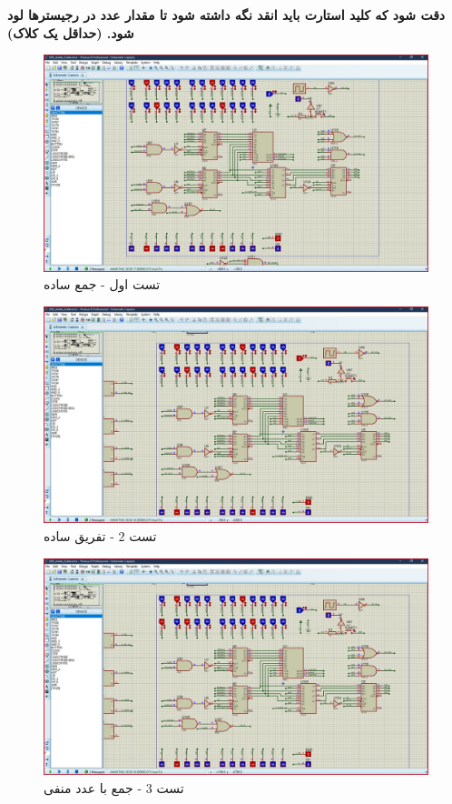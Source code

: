 \documentclass[fleqn]{article}
\begin{document}
\textbf{دقت شود که کلید استارت باید انقد نگه داشته شود تا مقدار عدد در رجیسترها لود شود. (حداقل یک کلاک)}

\begin{figure}[!htbp]
    \includegraphics[width=\textwidth]{Assets/test1.jpg}
    \caption{تست اول - جمع ساده}
    \label{t1}
\end{figure}

\begin{figure}[!htbp]
    \includegraphics[width=\textwidth]{Assets/test2.jpg}
    \caption{تست 2 - تفریق ساده}
    \label{t2}
\end{figure}

\begin{figure}[!htbp]
    \includegraphics[width=\textwidth]{Assets/test3.jpg}
    \caption{تست 3 - جمع با عدد منفی}
    \label{t3}
\end{figure}
\end{document}

